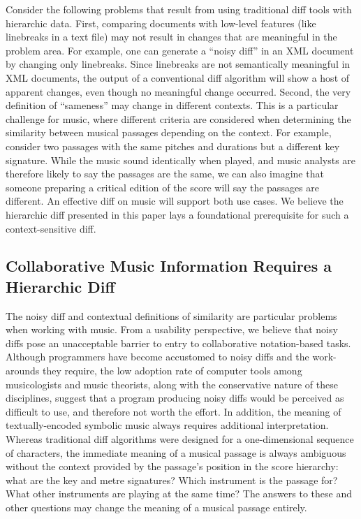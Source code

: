 \documentclass{article}
\begin{document}
Consider the following problems that result from using traditional diff tools with hierarchic data.
First, comparing documents with low-level features (like linebreaks in a text file) may not result in
changes that are meaningful in the problem area.
For example, one can generate a ``noisy diff'' in an XML document by changing only linebreaks.
Since linebreaks are not semantically meaningful in XML documents,
the output of a conventional diff algorithm will show a host of apparent changes,
even though no meaningful change occurred.
Second, the very definition of ``sameness'' may change in different contexts.
This is a particular challenge for music, where different criteria are considered when determining
the similarity between musical passages depending on the context.
For example, consider two passages with the same pitches and durations but a different key signature.
While the music sound identically when played,
and music analysts are therefore likely to say the passages are the same,
we can also imagine that someone preparing a critical edition of the score will say the passages are different.
An effective diff on music will support both use cases.
We believe the hierarchic diff presented in this paper lays a foundational prerequisite for such a context-sensitive diff.


\subsection{Collaborative Music Information Requires a Hierarchic Diff}
The noisy diff and contextual definitions of similarity are particular problems when working with music.
From a usability perspective,
we believe that noisy diffs pose an unacceptable barrier to entry to collaborative notation-based tasks.
Although programmers have become accustomed to noisy diffs and the work-arounds they require,
the low adoption rate of computer tools among musicologists and music theorists,
along with the conservative nature of these disciplines,
suggest that a program producing noisy diffs would be perceived as difficult to use,
and therefore not worth the effort.
In addition, the meaning of textually-encoded symbolic music always requires additional interpretation.
Whereas traditional diff algorithms were designed for a one-dimensional sequence of characters,
the immediate meaning of a musical passage is always ambiguous without the context provided by the passage's position in the score hierarchy:
what are the key and metre signatures?
Which instrument is the passage for?
What other instruments are playing at the same time?
The answers to these and other questions may change the meaning of a musical passage entirely.
\end{document}
